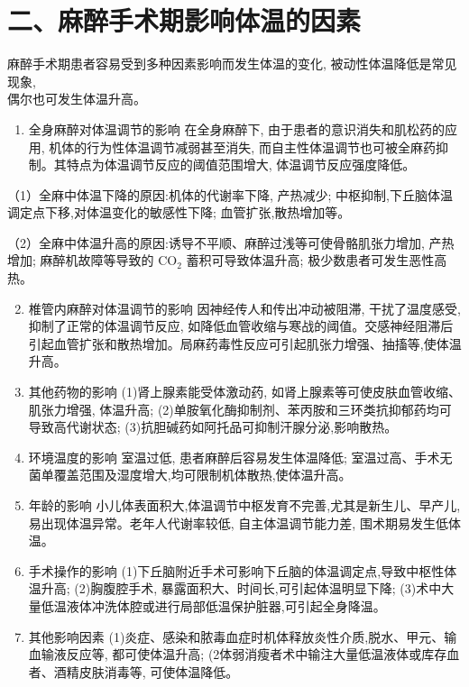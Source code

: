 \documentclass[10pt]{article}
\begin{document}
\section*{二、麻醉手术期影响体温的因素}
麻醉手术期患者容易受到多种因素影响而发生体温的变化, 被动性体温降低是常见现象,\\
偶尔也可发生体温升高。

\begin{enumerate}
  \item 全身麻醉对体温调节的影响 在全身麻醉下, 由于患者的意识消失和肌松药的应用, 机体的行为性体温调节减弱甚至消失, 而自主性体温调节也可被全麻药抑制。其特点为体温调节反应的阈值范围增大, 体温调节反应强度降低。
\end{enumerate}

（1）全麻中体温下降的原因:机体的代谢率下降, 产热减少; 中枢抑制,下丘脑体温调定点下移,对体温变化的敏感性下降; 血管扩张,散热增加等。

（2）全麻中体温升高的原因:诱导不平顺、麻醉过浅等可使骨骼肌张力增加, 产热增加; 麻醉机故障等导致的 $\mathrm{CO}_{2}$ 蓄积可导致体温升高; 极少数患者可发生恶性高热。

\begin{enumerate}
  \setcounter{enumi}{1}
  \item 椎管内麻醉对体温调节的影响 因神经传人和传出冲动被阻滞, 干扰了温度感受, 抑制了正常的体温调节反应, 如降低血管收缩与寒战的阈值。交感神经阻滞后引起血管扩张和散热增加。局麻药毒性反应可引起肌张力增强、抽搐等,使体温升高。

  \item 其他药物的影响 (1)肾上腺素能受体激动药, 如肾上腺素等可使皮肤血管收缩、肌张力增强, 体温升高; (2)单胺氧化酶抑制剂、苯丙胺和三环类抗抑郁药均可导致高代谢状态; (3)抗胆碱药如阿托品可抑制汗腺分泌,影响散热。

  \item 环境温度的影响 室温过低, 患者麻醉后容易发生体温降低; 室温过高、手术无菌单覆盖范围及湿度增大,均可限制机体散热,使体温升高。

  \item 年龄的影响 小儿体表面积大,体温调节中枢发育不完善,尤其是新生儿、早产儿,易出现体温异常。老年人代谢率较低, 自主体温调节能力差, 围术期易发生低体温。

  \item 手术操作的影响 (1)下丘脑附近手术可影响下丘脑的体温调定点,导致中枢性体温升高; (2)胸腹腔手术, 暴露面积大、时间长,可引起体温明显下降; (3)术中大量低温液体冲洗体腔或进行局部低温保护脏器,可引起全身降温。

  \item 其他影响因素 (1)炎症、感染和脓毒血症时机体释放炎性介质,脱水、甲元、输血输液反应等, 都可使体温升高; (2体弱消瘦者术中输注大量低温液体或库存血者、酒精皮肤消毒等, 可使体温降低。

\end{enumerate}
\end{document}
